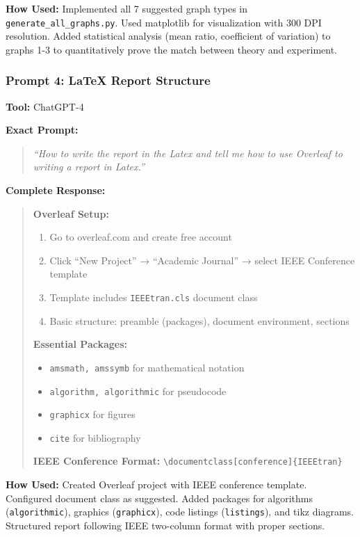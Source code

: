 \documentclass[conference]{IEEEtran}
\begin{document}
\textbf{How Used:}
Implemented all 7 suggested graph types in \texttt{generate\_all\_graphs.py}. Used matplotlib for visualization with 300 DPI resolution. Added statistical analysis (mean ratio, coefficient of variation) to graphs 1-3 to quantitatively prove the match between theory and experiment.

\vspace{0.4cm}

\subsubsection{Prompt 4: LaTeX Report Structure}

\textbf{Tool:} ChatGPT-4

\textbf{Exact Prompt:}
\begin{quote}
\textit{``How to write the report in the Latex and tell me how to use Overleaf to writing a report in Latex.''}
\end{quote}

\textbf{Complete Response:}
\begin{quote}
\small
\textbf{Overleaf Setup:}
\begin{enumerate}
    \item Go to overleaf.com and create free account
    \item Click ``New Project'' → ``Academic Journal'' → select IEEE Conference template
    \item Template includes \texttt{IEEEtran.cls} document class
    \item Basic structure: preamble (packages), document environment, sections
\end{enumerate}

\textbf{Essential Packages:}
\begin{itemize}
    \item \texttt{amsmath, amssymb} for mathematical notation
    \item \texttt{algorithm, algorithmic} for pseudocode
    \item \texttt{graphicx} for figures
    \item \texttt{cite} for bibliography
\end{itemize}

\textbf{IEEE Conference Format:}
\texttt{\textbackslash documentclass[conference]\{IEEEtran\}}
\end{quote}

\textbf{How Used:}
Created Overleaf project with IEEE conference template. Configured document class as suggested. Added packages for algorithms (\texttt{algorithmic}), graphics (\texttt{graphicx}), code listings (\texttt{listings}), and tikz diagrams. Structured report following IEEE two-column format with proper sections.
\end{document}
